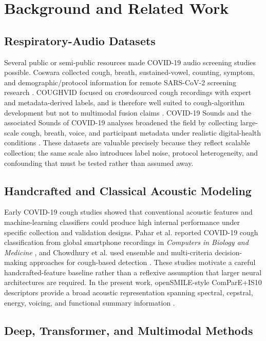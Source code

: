 \documentclass[preprint,12pt]{elsarticle}
\begin{document}
\section{Background and Related Work}

\subsection{Respiratory-Audio Datasets}

Several public or semi-public resources made COVID-19 audio screening studies possible. Coswara collected cough, breath, sustained-vowel, counting, symptom, and demographic/protocol information for remote SARS-CoV-2 screening research \citep{bhattacharya2023coswara}. COUGHVID focused on crowdsourced cough recordings with expert and metadata-derived labels, and is therefore well suited to cough-algorithm development but not to multimodal fusion claims \citep{orlandic2021coughvid}. COVID-19 Sounds and the associated Sounds of COVID-19 analyses broadened the field by collecting large-scale cough, breath, voice, and participant metadata under realistic digital-health conditions \citep{xia2021covid,han2022sounds}. These datasets are valuable precisely because they reflect scalable collection; the same scale also introduces label noise, protocol heterogeneity, and confounding that must be tested rather than assumed away.

\subsection{Handcrafted and Classical Acoustic Modeling}

Early COVID-19 cough studies showed that conventional acoustic features and machine-learning classifiers could produce high internal performance under specific collection and validation designs. Pahar et al. reported COVID-19 cough classification from global smartphone recordings in \textit{Computers in Biology and Medicine} \citep{pahar2021global}, and Chowdhury et al. used ensemble and multi-criteria decision-making approaches for cough-based detection \citep{chowdhury2022mcdm}. These studies motivate a careful handcrafted-feature baseline rather than a reflexive assumption that larger neural architectures are required. In the present work, openSMILE-style ComParE+IS10 descriptors provide a broad acoustic representation spanning spectral, cepstral, energy, voicing, and functional summary information \citep{eyben2010opensmile}.

\subsection{Deep, Transformer, and Multimodal Methods}
\end{document}
